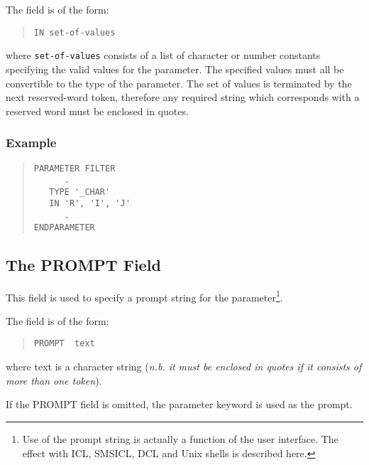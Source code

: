 \documentclass[twoside,11pt]{article}
\newcommand{\xlabel}[1]{}
\renewcommand{\_}{\texttt{\symbol{95}}}
\begin{document}
The field is of the form:
\begin{quote} \begin{verbatim}
IN set-of-values
\end{verbatim} \end{quote}
where \texttt{set-of-values} consists of a list of character or number
constants specifying the valid values for the parameter. 
The specified values must all be convertible to the type of the parameter.
The set of values is terminated by the next reserved-word token, therefore
any required string which corresponds with a reserved word must be enclosed in
quotes.

\subsubsection*{Example}
\begin{quote} \begin{verbatim}
PARAMETER FILTER
      .
   TYPE '_CHAR'
   IN 'R', 'I', 'J'
      .
ENDPARAMETER
\end{verbatim} \end{quote}

\subsection{The PROMPT Field\xlabel{the_prompt_field}}

This field is used to specify a prompt string for the parameter\footnote{Use
of the prompt string is actually a function of the user interface.
The effect with ICL, SMSICL, DCL and Unix shells is described here.}.

The field is of the form:
\begin{quote} \begin{verbatim}
PROMPT  text
\end{verbatim} \end{quote}
where text is a character string ({\em n.b. it must be enclosed in quotes
if it consists of more than one token}\/).

If the PROMPT field is omitted, the parameter keyword is used as the prompt.
\end{document}
